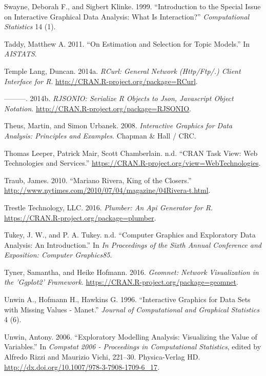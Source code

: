 \documentclass[12pt,]{isuthesis}
\begin{document}
\hypertarget{ref-swayne-klinke}{}
Swayne, Deborah F., and Sigbert Klinke. 1999. ``Introduction to the
Special Issue on Interactive Graphical Data Analysis: What Is
Interaction?'' \emph{Computational Statistics} 14 (1).

\hypertarget{ref-Taddy}{}
Taddy, Matthew A. 2011. ``On Estimation and Selection for Topic
Models.'' In \emph{AISTATS}.

\hypertarget{ref-RCurl}{}
Temple Lang, Duncan. 2014a. \emph{RCurl: General Network (Http/Ftp/.)
Client Interface for R}. \url{http://CRAN.R-project.org/package=RCurl}.

\hypertarget{ref-RJSONIO}{}
---------. 2014b. \emph{RJSONIO: Serialize R Objects to Json, Javascript
Object Notation}. \url{http://CRAN.R-project.org/package=RJSONIO}.

\hypertarget{ref-mondrianbook}{}
Theus, Martin, and Simon Urbanek. 2008. \emph{Interactive Graphics for
Data Analysis: Principles and Examples}. Chapman \& Hall / CRC.

\hypertarget{ref-WebServices}{}
Thomas Leeper, Patrick Mair, Scott Chamberlain. n.d. ``CRAN Task View:
Web Technologies and Services.''
\url{https://CRAN.R-project.org/view=WebTechnologies}.

\hypertarget{ref-NYT}{}
Traub, James. 2010. ``Mariano Rivera, King of the Closers.''
\url{http://www.nytimes.com/2010/07/04/magazine/04Rivera-t.html}.

\hypertarget{ref-plumber}{}
Trestle Technology, LLC. 2016. \emph{Plumber: An Api Generator for R}.
\url{https://CRAN.R-project.org/package=plumber}.

\hypertarget{ref-scagnostics-tukey}{}
Tukey, J. W., and P. A. Tukey. n.d. ``Computer Graphics and Exploratory
Data Analysis: An Introduction.'' In \emph{In Proceedings of the Sixth
Annual Conference and Exposition: Computer Graphics85}.

\hypertarget{ref-geomnet}{}
Tyner, Samantha, and Heike Hofmann. 2016. \emph{Geomnet: Network
Visualization in the 'Ggplot2' Framework}.
\url{https://CRAN.R-project.org/package=geomnet}.

\hypertarget{ref-MANET}{}
Unwin A., Hofmann H., Hawkins G. 1996. ``Interactive Graphics for Data
Sets with Missing Values - Manet.'' \emph{Journal of Computational and
Graphical Statistics} 4 (6).

\hypertarget{ref-Unwin:2006}{}
Unwin, Antony. 2006. ``Exploratory Modelling Analysis: Visualizing the
Value of Variables.'' In \emph{Compstat 2006 - Proceedings in
Computational Statistics}, edited by Alfredo Rizzi and Maurizio Vichi,
221--30. Physica-Verlag HD.
\url{http://dx.doi.org/10.1007/978-3-7908-1709-6_17}.
\end{document}
